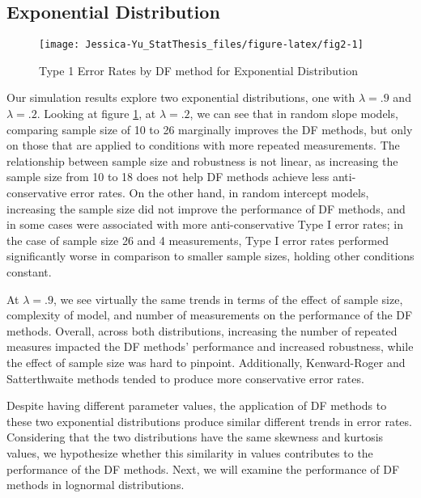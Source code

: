 \documentclass[12pt, twoside]{amherstthesis}
\begin{document}
\hypertarget{exponential-distribution}{%
\subsection{Exponential Distribution}\label{exponential-distribution}}
\begin{figure}

{\centering \texttt{[image: Jessica-Yu\_StatThesis\_files/figure-latex/fig2-1]} 

}

\caption{Type 1 Error Rates by DF method for Exponential Distribution}\label{fig:fig2}
\end{figure}
Our simulation results explore two exponential distributions, one with \(\lambda = .9\) and \(\lambda = .2\). Looking at figure \ref{fig:fig2}, at \(\lambda = .2\), we can see that in random slope models, comparing sample size of 10 to 26 marginally improves the DF methods, but only on those that are applied to conditions with more repeated measurements. The relationship between sample size and robustness is not linear, as increasing the sample size from 10 to 18 does not help DF methods achieve less anti-conservative error rates. On the other hand, in random intercept models, increasing the sample size did not improve the performance of DF methods, and in some cases were associated with more anti-conservative Type I error rates; in the case of sample size 26 and 4 measurements, Type I error rates performed significantly worse in comparison to smaller sample sizes, holding other conditions constant.

At \(\lambda = .9\), we see virtually the same trends in terms of the effect of sample size, complexity of model, and number of measurements on the performance of the DF methods. Overall, across both distributions, increasing the number of repeated measures impacted the DF methods' performance and increased robustness, while the effect of sample size was hard to pinpoint. Additionally, Kenward-Roger and Satterthwaite methods tended to produce more conservative error rates.

Despite having different parameter values, the application of DF methods to these two exponential distributions produce similar different trends in error rates. Considering that the two distributions have the same skewness and kurtosis values, we hypothesize whether this similarity in values contributes to the performance of the DF methods. Next, we will examine the performance of DF methods in lognormal distributions.
\end{document}
